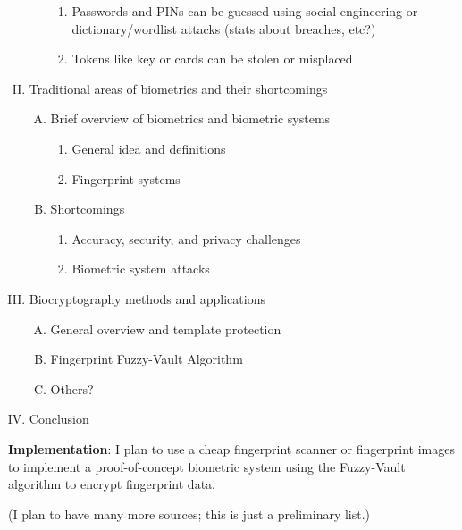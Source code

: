 \documentclass[10pt]{article}
\begin{document}
\begin{enumerate}[I.]
\begin{enumerate}[A.]
\begin{enumerate}[1.]
        \item Passwords and PINs can be guessed using social engineering or dictionary/wordlist attacks (stats about breaches, etc?)
        \item Tokens like key or cards can be stolen or misplaced
        \end{enumerate}
    \end{enumerate}
\item Traditional areas of biometrics and their shortcomings
     \begin{enumerate}[A.]
    \item Brief overview of biometrics and biometric systems 
        \begin{enumerate}[1.]
        \item General idea and definitions
        \item Fingerprint systems
        \end{enumerate}
    \item Shortcomings 
        \begin{enumerate}[1.]
        \item Accuracy, security, and privacy challenges
        \item Biometric system attacks
        \end{enumerate}
    \end{enumerate}
\item Biocryptography methods and applications
    \begin{enumerate}[A.]
    \item General overview and template protection
    \item Fingerprint Fuzzy-Vault Algorithm
    \item Others?
    \end{enumerate}
\item Conclusion
\end{enumerate}

\textbf{Implementation}: I plan to use a cheap fingerprint scanner or fingerprint images to implement a proof-of-concept biometric system using the Fuzzy-Vault algorithm to encrypt fingerprint data.
\nocite{*}
{}


(I plan to have many more sources; this is just a preliminary list.)
\end{document}
